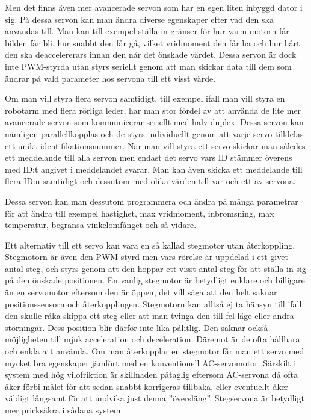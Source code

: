 \documentclass[a4paper,12pt]{article}
\begin{document}
Men det finns även mer avancerade servon som har en egen liten inbyggd dator i sig. På dessa servon kan man ändra diverse egenskaper efter vad den ska användas till. Man kan till exempel ställa in gränser för hur varm motorn får bilden får bli, hur snabbt den får gå, vilket vridmoment den får ha och hur hårt den ska deaccelererars innan den når det önskade värdet. Dessa servon är dock inte PWM-styrda utan styrs seriellt genom att man skickar data till dem som ändrar på vald parameter hos servona till ett visst värde. 
 
Om man vill styra flera servon samtidigt, till exempel ifall man vill styra en robotarm med flera rörliga leder, har man stor fördel av att använda de lite mer avancerade servon som kommunicerar seriellt med halv duplex. Dessa servon kan nämligen parallellkopplas och de styrs individuellt genom att varje servo tilldelas ett unikt identifikationsnummer. När man vill styra ett servo skickar man således ett meddelande till alla servon men endast det servo vars ID stämmer överens med ID:t angivet i meddelandet svarar. Man kan även skicka ett meddelande till flera ID:n samtidigt och dessutom med olika värden till var och ett av servona. 
 
Dessa servon kan man dessutom programmera och ändra på många parametrar för att ändra till exempel hastighet, max vridmoment, inbromsning, max temperatur, begränsa vinkelomfånget och så vidare.
 
Ett alternativ till ett servo kan vara en så kallad stegmotor utan återkoppling. Stegmotorn är även den PWM-styrd men vars rörelse är uppdelad i ett givet antal steg, och styrs genom att den hoppar ett visst antal steg för att ställa in sig på den önskade positionen. En vanlig stegmotor är betydligt enklare och billigare än en servomotor eftersom den är öppen, det vill säga att den helt saknar positionssensorn och återkopplingen. Stegmotorn kan alltså ej ta hänsyn till ifall den skulle råka skippa ett steg eller att man tvinga den till fel läge eller andra störningar. Dess position blir därför inte lika pålitlig. Den saknar också möjligheten till mjuk acceleration och deceleration. Däremot är de ofta hållbara och enkla att använda. Om man återkopplar en stegmotor får man ett servo med mycket bra egenskaper jämfört med en konventionell AC-servomotor.  Särskilt i system med hög vilofriktion är skillnaden påtaglig eftersom AC-servona då ofta åker förbi målet för att sedan snabbt korrigeras tillbaka, eller eventuellt åker väldigt långsamt för att undvika just denna ”översläng”. Stegservona är betydligt mer pricksäkra i sådana system. 
 
\end{document}
